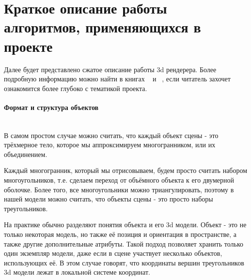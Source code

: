 \documentclass{article}
\begin{document}
\pagebreak

\section{Краткое описание работы алгоритмов, применяющихся в проекте}




Далее будет представлено сжатое описание работы 3d рендерера. Более подробную информацию можно найти в книгах ~\cite{LRN} и ~\cite{Math3d}, если читатель захочет ознакомится более глубоко с тематикой проекта.

\paragraph{Формат и структура объектов}
$\text{}$\\
В самом простом случае можно считать, что каждый объект сцены - это трёхмерное тело, которое мы аппроксимируем многогранником, или их объединением. 

Каждый многогранник, который мы отрисовываем, будем просто считать набором многоугольников, т.е. сделаем переход от объёмного объекта к его двумерной оболочке. 
Более того, все многоугольники можно триангулировать, поэтому в нашей модели можно считать, что объекты сцены - это просто наборы треугольников. 

На практике обычно разделяют понятия объекта и его 3d модели. Объект - это не только некоторая модель, но также её позиция и ориентация в пространстве, а также другие дополнительные атрибуты. Такой подход позволяет хранить только один экземпляр модели, даже если в сцене участвует несколько объектов, использующих её. В этом случае говорят, что координаты вершин треугольников 3d модели лежат в локальной системе координат. 
\end{document}
